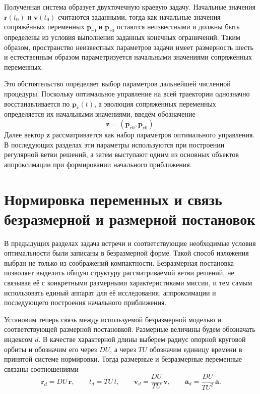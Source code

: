 Полученная система образует двухточечную краевую задачу. Начальные значения $\mathbf r(t_0)$ и $\mathbf v(t_0)$ считаются заданными, тогда как начальные значения сопряжённых переменных $\mathbf p_{r0}$ и $\mathbf p_{v0}$ остаются неизвестными и должны быть определены из условия выполнения заданных конечных ограничений. Таким образом, пространство неизвестных параметров задачи имеет размерность шесть и естественным образом параметризуется начальными значениями сопряжённых переменных.

Это обстоятельство определяет выбор параметров дальнейшей численной процедуры. Поскольку оптимальное управление на всей траектории однозначно восстанавливается по $\mathbf p_v(t)$, а эволюция сопряжённых переменных определяется их начальными значениями, введём обозначение
\begin{equation}
	\mathbf z=\left(\mathbf p_{r0},\mathbf p_{v0}\right).
\end{equation}
Далее вектор $\mathbf z$ рассматривается как набор параметров оптимального управления. В последующих разделах эти параметры используются при построении регулярной ветви решений, а затем выступают одним из основных объектов аппроксимации при формировании начального приближения.

\section{Нормировка переменных и связь безразмерной и размерной постановок}

В предыдущих разделах задача встречи и соответствующие необходимые условия оптимальности были записаны в безразмерной форме. Такой способ изложения выбран не только из соображений компактности. Безразмерная постановка позволяет выделить общую структуру рассматриваемой ветви решений, не связывая её с конкретными размерными характеристиками миссии, и тем самым использовать единый аппарат для её исследования, аппроксимации и последующего построения начального приближения.

Установим теперь связь между используемой безразмерной моделью и соответствующей размерной постановкой. Размерные величины будем обозначать индексом $d$. В качестве характерной длины выберем радиус опорной круговой орбиты и обозначим его через $DU$, а через $TU$ обозначим единицу времени в принятой системе нормировки. Тогда размерные и безразмерные переменные связаны соотношениями
\begin{equation}
	\mathbf r_d = DU\,\mathbf r,\qquad
	t_d = TU\,t,\qquad
	\mathbf v_d = \frac{DU}{TU}\,\mathbf v,\qquad
	\mathbf a_d = \frac{DU}{TU^2}\,\mathbf a.
\end{equation}

